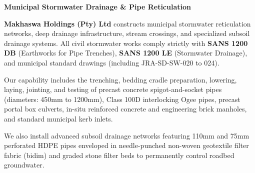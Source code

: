 \documentclass[a4paper,11pt]{article}
\begin{document}
\noindent
\begin{minipage}[t]{0.62\textwidth}
    \vspace{0pt}
    {\large\bfseries\color{mhnavy} Municipal Stormwater Drainage \& Pipe Reticulation}
    \vspace{0.12cm}

    {\fontsize{9pt}{13pt}\selectfont\color{mhtext}
    \textbf{Makhaswa Holdings (Pty) Ltd} constructs municipal stormwater reticulation networks, deep drainage infrastructure, stream crossings, and specialized subsoil drainage systems. All civil stormwater works comply strictly with \textbf{SANS 1200 DB} (Earthworks for Pipe Trenches), \textbf{SANS 1200 LE} (Stormwater Drainage), and municipal standard drawings (including JRA-SD-SW-020 to 024).
    }

    \vspace{0.22cm}

    {\fontsize{9pt}{13pt}\selectfont\color{mhtext}
    Our capability includes the trenching, bedding cradle preparation, lowering, laying, jointing, and testing of precast concrete spigot-and-socket pipes (diameters: 450mm to 1200mm), Class 100D interlocking Ogee pipes, precast portal box culverts, in-situ reinforced concrete and engineering brick manholes, and standard municipal kerb inlets.
    }

    \vspace{0.22cm}

    {\fontsize{9pt}{13pt}\selectfont\color{mhtext}
    We also install advanced subsoil drainage networks featuring 110mm and 75mm perforated HDPE pipes enveloped in needle-punched non-woven geotextile filter fabric (bidim) and graded stone filter beds to permanently control roadbed groundwater.
    }
\end{minipage}
\hfill
\end{document}

